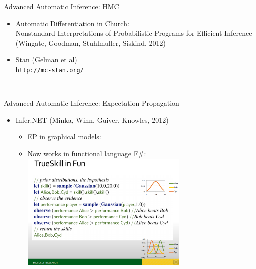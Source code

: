 \begin{frame}{Advanced Automatic Inference: HMC}

    \begin{itemize}
      \item Automatic Differentiation in Church:
      \\ Nonstandard Interpretations of Probabilistic Programs for Efficient Inference
{\color{DarkBlue} (Wingate, Goodman, Stuhlmuller, Siskind, 2012)}
      \item Stan (Gelman et al)
      \\
      \texttt{http://mc-stan.org/}
      \begin{alltt}
{\tiny
}
\end{alltt}  
      
    \end{itemize}

\end{frame}

\begin{frame}{Advanced Automatic Inference: Expectation Propagation}
    \begin{itemize}
      \item Infer.NET {\color{DarkBlue} (Minka, Winn, Guiver, Knowles, 2012)}
      \begin{itemize}
        \item EP in graphical models:
        \item Now works in functional language F\#:
        \includegraphics[width=8cm]{figures/fun}
      \end{itemize}
    \end{itemize}
    
\end{frame}

